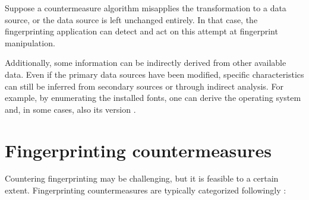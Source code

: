 Suppose a countermeasure algorithm misapplies the transformation to a data source, or the data source is left unchanged entirely. In that case, the fingerprinting application can detect and act on this attempt at fingerprint manipulation.

Additionally, some information can be indirectly derived from other available data. Even if the primary data sources have been modified, specific characteristics can still be inferred from secondary sources or through indirect analysis. For example, by enumerating the installed fonts, one can derive the operating system and, in some cases, also its version \cite{JSTemplateAttacks}.

\section{Fingerprinting countermeasures}
\label{Section:FingerprintingCounter}

Countering fingerprinting may be challenging, but it is feasible to a certain extent. Fingerprinting countermeasures are typically categorized followingly \cite{JShelterPaper, PriVaricator}:

